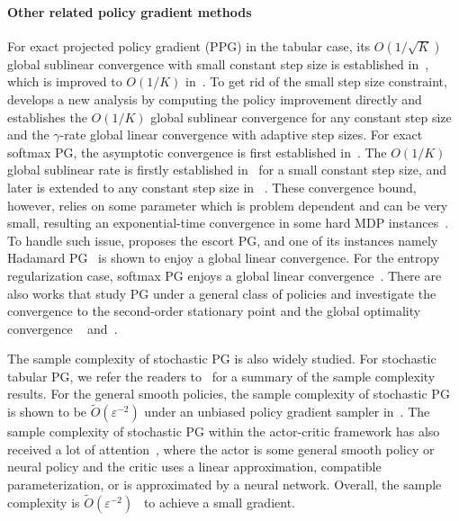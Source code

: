 \documentclass[10pt]{article}
\theoremstyle{plain}
\theoremstyle{definition}
\begin{document}
\paragraph{Other related policy gradient methods} For exact projected policy gradient (PPG) in the tabular case, its $O(1/\sqrt{K})$ global sublinear convergence with small constant step size is established in~\citet{Agarwal_Kakade_Lee_Mahajan_2019}, which is improved to $O(1/K)$ in~\citet{Xiao_2022}. To get rid of the small step size constraint, \citet{ppgliu} develops a new analysis by computing the policy improvement directly and  establishes the $O(1/K)$ global sublinear convergence for any constant step size  and the $\gamma$-rate global linear convergence with  adaptive step sizes. For exact softmax PG, the asymptotic convergence is first established in~\citet{Agarwal_Kakade_Lee_Mahajan_2019}. The  $O(1/K)$ global sublinear rate is firstly established in~\citet{Mei_Xiao_Szepesvari_Schuurmans_2020} for a small constant step size, and later is extended to any constant step size in ~\citep{pg-liu}. These convergence bound, however, relies on some parameter  which is problem dependent and can be very small, resulting an exponential-time convergence in some hard MDP instances~\citep{li2023exponential}. To handle such issue, \citet{Mei_Xiao_Dai_Li_Szepesvari_Schuurmans_2020} proposes the escort PG, and one of its instances namely Hadamard PG~\citep{hadamard_pg} is shown to enjoy a global linear convergence. For the entropy regularization case,  softmax PG enjoys a global linear convergence~\citep{pg-liu,Mei_Xiao_Szepesvari_Schuurmans_2020}. There are also works that study PG under a general class of policies and investigate the convergence to the second-order stationary point and the global optimality convergence ~\citet{zhang2020global} and~\citet{Bhandari_Russo_2021}.

The sample complexity of stochastic PG is also widely studied. For stochastic tabular PG, we refer the readers to~\citet{yuan2022general} for a summary of the sample complexity results. For the general smooth policies, the sample complexity of stochastic PG is shown to be $\tilde O(\varepsilon^{-2})$ under an unbiased policy gradient sampler in~\citet{yuan2022general}. The sample complexity of stochastic PG  within the actor-critic framework has also received a lot of attention~\citep{olshevsky2023small,wang2019neural,chen2021closing,xu2020improving,xu2020non,wang2024non,chen2023finite,wu2020finite,kumar2023ac,xu2021doubly,qiu2021on,suttle2023beyond,barakat2022analysis,tian2023convergence}, where the actor is some general smooth policy or neural policy and the critic uses a linear approximation, compatible parameterization, or is approximated by a neural network. Overall, the sample complexity is $\tilde O(\varepsilon^{-2})$~\citep{xu2020improving,chen2023finite,wang2024non} to achieve a small gradient.
\end{document}
